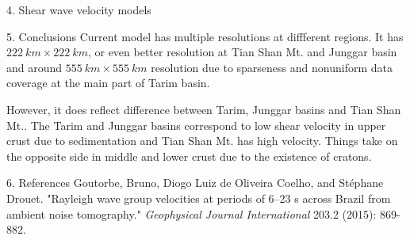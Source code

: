\documentclass[
    landscape,      %
    paperwidth = 1120mm,
    paperheight = 820mm,
    fontscale = 0.45,
    margin = 1.7cm,
]{baposter}
\begin{document}
\begin{poster}
\begin{posterbox}[column=2 ]{4. Shear wave velocity models}
\end{posterbox}

\begin{posterbox}[column=2, below=auto]{5. Conclusions}
Current model has multiple resolutions at diffferent regions. It has
$222 \ \textit{km} \times 222 \ \textit{km}$, or even better resolution at
Tian Shan Mt. and Junggar basin and around $555 \ \textit{km} \times 555 \ \textit{km}$ resolution
due to sparseness and nonuniform data coverage at the main part of Tarim basin.

However, it does reflect difference between Tarim, Junggar basins and Tian Shan Mt..
The Tarim and Junggar basins correspond to low shear velocity in upper crust due to sedimentation and
Tian Shan Mt. has high velocity. Things take on the opposite side in middle and lower crust due to the
existence of cratons.
\end{posterbox}

\begin{posterbox}[column=2, below=auto]{6. References}
Goutorbe, Bruno, Diogo Luiz de Oliveira Coelho, and Stéphane Drouet. "Rayleigh wave group velocities at periods of 6–23 s across Brazil from ambient noise tomography." {\itshape Geophysical Journal International} 203.2 (2015): 869-882.
\end{posterbox}

\end{poster}
\end{document}
